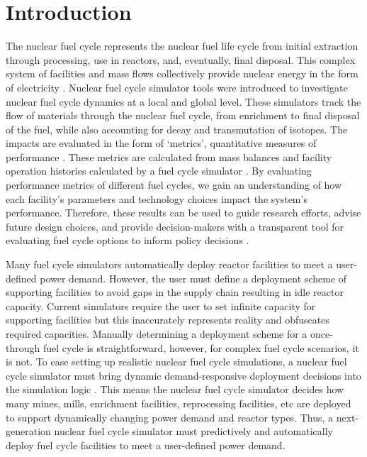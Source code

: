 \section{Introduction}
The nuclear fuel cycle represents the nuclear fuel life cycle from initial
extraction through processing, use in reactors, and, eventually, 
final disposal.
This complex system of facilities and mass flows 
collectively provide nuclear energy 
in the form of electricity \cite{yacout_modeling_2005}.
Nuclear fuel cycle simulator tools were introduced to investigate 
nuclear fuel cycle dynamics at a local and global level. 
These simulators track the flow of materials through the nuclear fuel cycle, 
from enrichment to final disposal of the fuel, while also accounting for 
decay and transmutation of isotopes. 
The impacts are evaluated in the form of `metrics', quantitative measures 
of performance \cite{huff_fundamental_2016}. 
These metrics are calculated from mass balances and facility operation 
histories calculated by a fuel cycle simulator \cite{huff_fundamental_2016}. 
By evaluating performance metrics of different fuel cycles, we gain an 
understanding of how each facility's parameters and technology choices 
impact the system's performance. 
Therefore, these results can be used to guide research 
efforts, advise future design choices, and provide 
decision-makers with a transparent tool for evaluating 
fuel cycle options to inform policy decisions 
\cite{yacout_modeling_2005}.

Many fuel cycle simulators automatically deploy reactor facilities 
to meet a user-defined power demand. 
However, the user must define a deployment scheme of 
supporting facilities to avoid gaps in the supply 
chain resulting in idle reactor capacity. 
Current simulators require the user to set infinite capacity 
for supporting facilities but this inaccurately represents 
reality and obfuscates required capacities. 
Manually determining a deployment scheme for a once-through 
fuel cycle is straightforward, however, for complex fuel cycle 
scenarios, it is not.   
To ease setting up realistic nuclear fuel cycle simulations, a nuclear fuel cycle simulator
must bring dynamic demand-responsive deployment decisions into 
the simulation logic \cite{huff_current_2017}. 
This means the nuclear fuel cycle simulator decides how many mines, 
mills, enrichment facilities,
reprocessing facilities, etc are deployed to support dynamically 
changing power demand and reactor types.  
Thus, a next-generation nuclear fuel cycle simulator must predictively and 
automatically deploy fuel cycle facilities to meet a user-defined 
power demand. 

